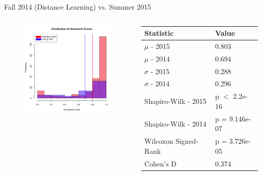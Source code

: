 \documentclass{beamer}
\begin{document}
\begin{frame}{Fall 2014 (Distance Learning) vs. Summer 2015}
\begin{columns}
\begin{column}{2in}
\begin{figure}
	\includegraphics[width=2in]{img/chapter4/hw_su15_vs_f14d}
\end{figure}
\end{column}
\begin{column}{2in}
\begin{scriptsize}
\begin{table}
  \begin{tabular}{|l|l|}
    \hline
    \textbf{Statistic} & \textbf{Value} \\
	\hline
	$\mu$ - 2015 & 0.803 \\
	\hline
	$\mu$ - 2014 & 0.694 \\
	\hline
	$\sigma$ - 2015 & 0.288 \\
	\hline
	$\sigma$ - 2014 & 0.296 \\
	\hline
	Shapiro-Wilk - 2015 & p $<$ 2.2e-16 \\
	\hline
	Shapiro-Wilk - 2014 & p = 9.146e-07 \\
	\hline
	Wilcoxon Signed-Rank & p = 3.726e-05 \\
	\hline
	Cohen's D & 0.374 \\
	\hline
  \end{tabular}
\end{table}
\end{scriptsize}
\end{column}
\end{columns}
\end{frame}
\end{document}

